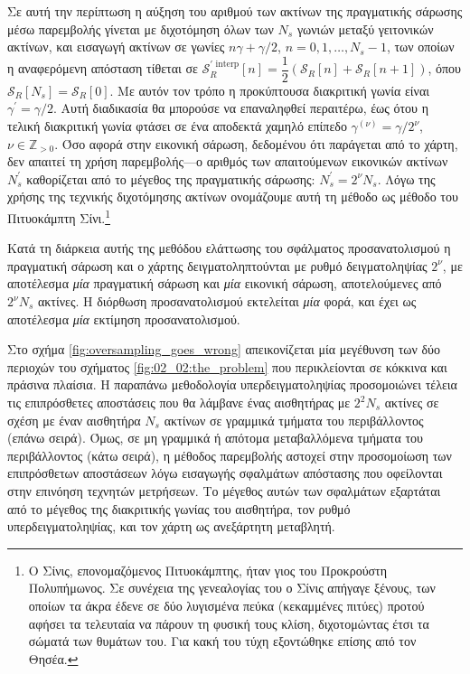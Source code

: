 Σε αυτή την περίπτωση η αύξηση του αριθμού των ακτίνων της πραγματικής σάρωσης
μέσω παρεμβολής γίνεται με διχοτόμηση όλων των $N_s$ γωνιών μεταξύ γειτονικών
ακτίνων, και εισαγωγή ακτίνων σε γωνίες
$n\gamma + \gamma/2$, $n = 0,1,\dots,N_s-1$, των οποίων η αναφερόμενη απόσταση
τίθεται σε
$\mathcal{S}_R^{\prime\text{\ interp}}[n] = \dfrac{1}{2}(\mathcal{S}_R[n] + \mathcal{S}_R[n+1])$,
όπου $\mathcal{S}_R[N_s] = \mathcal{S}_R[0]$. Με αυτόν τον τρόπο
η προκύπτουσα διακριτική γωνία είναι $\gamma^\prime = \gamma / 2$. Αυτή
διαδικασία θα μπορούσε να επαναληφθεί περαιτέρω, έως ότου η τελική
διακριτική γωνία φτάσει σε ένα αποδεκτά χαμηλό επίπεδο
$\gamma^{(\nu)} = \gamma / 2^\nu$, $\nu \in \mathbb{Z}_{> 0}$. Όσο αφορά στην
εικονική σάρωση, δεδομένου ότι παράγεται από το χάρτη, δεν απαιτεί τη χρήση
παρεμβολής---ο αριθμός των απαιτούμενων εικονικών ακτίνων $N_s^\prime$
καθορίζεται από το μέγεθος της πραγματικής σάρωσης: $N_s^\prime = 2^\nu N_s$.
Λόγω της χρήσης της τεχνικής διχοτόμησης ακτίνων ονομάζουμε αυτή τη μέθοδο ως
μέθοδο του Πιτυοκάμπτη Σίνι.\footnote{Ο Σίνις, επονομαζόμενος Πιτυοκάμπτης, ήταν
γιος του Προκρούστη Πολυπήμωνος. Σε συνέχεια της γενεαλογίας του ο Σίνις απήγαγε
ξένους, των οποίων τα άκρα έδενε σε δύο λυγισμένα πεύκα (κεκαμμένες πιτύες)
προτού αφήσει τα τελευταία να πάρουν τη φυσική τους κλίση, διχοτομώντας έτσι τα
σώματά των θυμάτων του. Για κακή του τύχη εξοντώθηκε επίσης από τον Θησέα.}

\begin{remark}
  \label{rem:sizes_incorrect}
  Κατά τη διάρκεια αυτής της μεθόδου ελάττωσης του σφάλματος προσανατολισμού η
  πραγματική σάρωση και ο χάρτης δειγματοληπτούνται με ρυθμό δειγματοληψίας
  $2^\nu$, με αποτέλεσμα \textit{μία} πραγματική σάρωση και \textit{μία}
  εικονική σάρωση, αποτελούμενες από $2^\nu N_s$ ακτίνες. Η διόρθωση
  προσανατολισμού εκτελείται \textit{μία} φορά, και έχει ως αποτέλεσμα
  \textit{μία} εκτίμηση προσανατολισμού.
\end{remark}

Στο σχήμα \ref{fig:oversampling_goes_wrong} απεικονίζεται μία μεγέθυνση των δύο
περιοχών του σχήματος \ref{fig:02_02:the_problem} που περικλείονται σε κόκκινα
και πράσινα πλαίσια. Η παραπάνω μεθοδολογία υπερδειγματοληψίας προσομοιώνει
τέλεια τις επιπρόσθετες αποστάσεις που θα λάμβανε ένας αισθητήρας με $2^2 N_s$
ακτίνες σε σχέση με έναν αισθητήρα $N_s$ ακτίνων σε γραμμικά τμήματα του
περιβάλλοντος (επάνω σειρά). Όμως, σε μη γραμμικά ή απότομα μεταβαλλόμενα
τμήματα του περιβάλλοντος (κάτω σειρά), η μέθοδος παρεμβολής αστοχεί στην
προσομοίωση των επιπρόσθετων αποστάσεων λόγω εισαγωγής σφαλμάτων απόστασης που
οφείλονται στην επινόηση τεχνητών μετρήσεων. Το μέγεθος αυτών των σφαλμάτων
εξαρτάται από το μέγεθος της διακριτικής γωνίας του αισθητήρα, τον ρυθμό
υπερδειγματοληψίας, και τον χάρτη ως ανεξάρτητη μεταβλητή.

